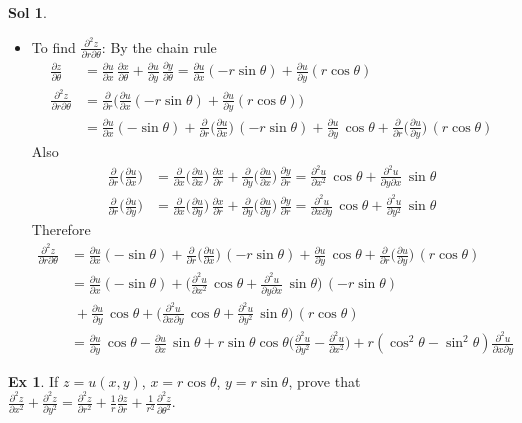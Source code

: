 \documentclass[12pt]{extarticle}
\newcommand{\ds}{\displaystyle}
\theoremstyle{definition}
\newtheorem*{ex}{Ex}
\newtheorem*{sol}{Sol}
\newcommand{\pdiff}[2]{\frac{\partial #1}{\partial #2}}
\newcommand{\pdifft}[2]{\frac{\partial^2 #1}{\partial #2^2}}
\begin{document}
\begin{sol}
\begin{itemize}
    \item To find $\ds\frac{\partial^2 z}{\partial r\partial\theta}$: By the chain rule
  \begin{align*}
    \pdiff{z}{\theta} &= \pdiff{u}{x}\,\pdiff{x}{\theta} + \pdiff{u}{y}\,\pdiff{y}{\theta} = \pdiff{u}{x}(-r\sin\theta) + \pdiff{u}{y}(r\cos\theta) \\
    \frac{\partial^2 z}{\partial r\partial\theta} &= \pdiff{}{r}\bigg(\pdiff{u}{x}(-r\sin\theta) + \pdiff{u}{y}(r\cos\theta)\bigg) \\ &= \pdiff{u}{x}(-\sin\theta) + \pdiff{}{r}\bigg(\pdiff{u}{x}\bigg)\,(-r\sin\theta) + \pdiff{u}{y}\,\cos\theta + \pdiff{}{r}\bigg(\pdiff{u}{y}\bigg)\,(r\cos\theta)
  \end{align*}
  Also
  \begin{align*}
    \pdiff{}{r}\bigg(\pdiff{u}{x}\bigg) &= \pdiff{}{x}\bigg(\pdiff{u}{x}\bigg)\,\pdiff{x}{r} + \pdiff{}{y}\bigg(\pdiff{u}{x}\bigg)\,\pdiff{y}{r} = \pdifft{u}{x}\,\cos\theta + \frac{\partial^2 u}{\partial y\partial x}\,\sin\theta \\
    \pdiff{}{r}\bigg(\pdiff{u}{y}\bigg) &= \pdiff{}{x}\bigg(\pdiff{u}{y}\bigg)\,\pdiff{x}{r} + \pdiff{}{y}\bigg(\pdiff{u}{y}\bigg)\,\pdiff{y}{r} = \frac{\partial^2 u}{\partial x\partial y}\,\cos\theta + \pdifft{u}{y}\,\sin\theta
  \end{align*}
  Therefore
  \begin{align*}
    \frac{\partial^2 z}{\partial r\partial\theta} &= \pdiff{u}{x}(-\sin\theta) + \pdiff{}{r}\bigg(\pdiff{u}{x}\bigg)\,(-r\sin\theta) + \pdiff{u}{y}\,\cos\theta + \pdiff{}{r}\bigg(\pdiff{u}{y}\bigg)\,(r\cos\theta)\\
    &= \pdiff{u}{x}(-\sin\theta) + \bigg(\pdifft{u}{x}\,\cos\theta + \frac{\partial^2 u}{\partial y\partial x}\,\sin\theta\bigg)\,(-r\sin\theta) \\ &\;+ \pdiff{u}{y}\,\cos\theta + \bigg(\frac{\partial^2 u}{\partial x\partial y}\,\cos\theta + \pdifft{u}{y}\,\sin\theta\bigg)\,(r\cos\theta) \\
    &= \pdiff{u}{y}\,\cos\theta - \pdiff{u}{x}\,\sin\theta + r\sin\theta\cos\theta\bigg(\pdifft{u}{y} - \pdifft{u}{x}\bigg) + r(\cos^2\theta - \sin^2\theta)\frac{\partial^2 u}{\partial x\partial y}
  \end{align*}
  \end{itemize}
\end{sol}

\begin{ex}
  If $\ds z = u(x, y)$, $\ds x = r\cos\theta$, $\ds y = r\sin\theta$, prove that $\ds\pdifft{z}{x} + \pdifft{z}{y} = \pdifft{z}{r} + \frac{1}{r}\pdiff{z}{r} + \frac{1}{r^2}\pdifft{z}{\theta}$. 
\end{ex}
\end{document}
